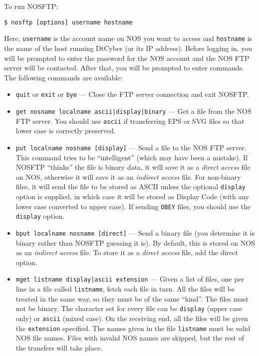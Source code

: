 \documentclass[a4paper,twoside,11pt]{article}
\newcommand{\newpara}{\par\vspace{4mm}\noindent}
\newcommand{\textttc}[1]{\texttt{\textcolor{OurRed}{#1}}}
\begin{document}
\newpara
To run NOSFTP:
\begin{lstlisting}
$ nosftp [options] username hostname
\end{lstlisting}
Here, \textttc{username} is the account name on NOS you want to access and \texttt{hostname} is the name of the host
running DtCyber (or its IP address). Before logging in, you will be prompted to enter the password for the
NOS account and the NOS FTP server will be contacted. After that, you will be prompted to enter
commands. The following commands are available:
\begin{itemize}
\item \textttc{quit} or \textttc{exit} or \textttc{bye} --- Close the FTP server connection and exit NOSFTP.
\item \textttc{get nosname localname ascii|display|binary} --- Get a file from the NOS FTP server. You should
  use \texttt{ascii} if transferring EPS or SVG files so that lower case is correctly preserved.
\item \textttc{put localname nosname [display]} --- Send a file to the NOS FTP server. This command
  tries to be ``intelligent'' (which may have been a mistake). If NOSFTP ``thinks'' the file is binary data,
  it will save it as a \emph{direct access} file on NOS, otherwise it will save it as an \emph{indirect access} file.
  For non-binary files, it will send the file to be stored as ASCII unless
  the optional \texttt{display} option is supplied,
  in which case it will be stored as Display Code (with any lower case converted to upper case).
  If sending \texttt{OBEY} files, you should use the \texttt{display} option.
\item \textttc{bput localname nosname [direct]} --- Send a binary file (you determine it is binary rather than
  NOSFTP guessing it is). By default, this is stored on NOS as an \emph{indirect access} file. To store it as a
  \emph{direct access} file, add the direct option.
\item \textttc{mget listname display|ascii extension} --- Given a list of files, one per line in a file called
  \texttt{listname}, fetch each file in turn. All the files will be treated in the same way, so they must be
  of the same ``kind''. The files must not be binary. The character set for every file can be \texttt{display}
  (upper case only) or \texttt{ascii} (mixed case). On the receiving end, all the files will be given the
  \texttt{extension} specified. The names given in the file \texttt{listname} must be valid NOS file names.
  Files with invalid NOS names are skipped, but the rest of the transfers will take place.

\end{itemize}
\end{document}
